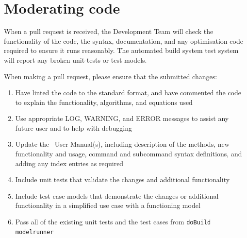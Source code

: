 \section{Moderating code\label{sec:Maintaining}}

When a pull request is received, the Development Team will check the functionality of the code, the syntax, documentation, and any optimisation code required to ensure it runs reasonably. The automated build system test system will report any broken unit-tests or test models. 

When making a pull request, please ensure that the submitted changes:
\begin{enumerate}
	\item Have linted the code to the standard format, and have commented the code to explain the functionality, algorithms, and equations used
	\item Use appropriate LOG, WARNING, and ERROR messages to assist any future user and to help with debugging
	\item Update the \CNAME\ User Manual(s), including description of the methods, new functionality and usage, command and subcommand syntax definitions, and adding any index entries as required
	\item Include unit tests that validate the changes and additional functionality
	\item Include test case models that demonstrate the changes or additional functionality in a simplified use case with a functioning model
	\item Pass all of the existing unit tests and the test cases from \texttt{doBuild modelrunner}
\end{enumerate}
